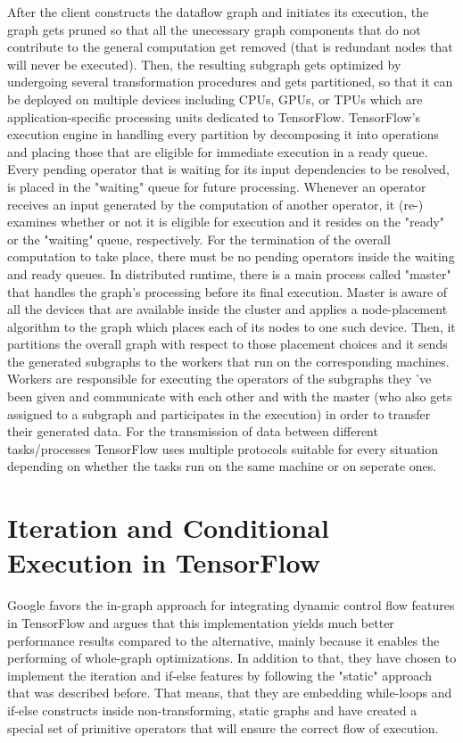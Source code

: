 \documentclass[ack,preface]{dithesis}
\begin{document}
After the client constructs the dataflow graph and initiates its execution, the graph gets pruned so that all the unecessary graph components that do not contribute to the general computation get removed (that is redundant nodes that will never be executed). Then, the resulting subgraph gets optimized by undergoing several transformation procedures and gets partitioned, so that it can be deployed on multiple devices including CPUs, GPUs, or TPUs which are application-specific processing units dedicated to TensorFlow. TensorFlow's execution engine in handling every partition by decomposing it into operations and placing those that are eligible for immediate execution in a ready queue. Every pending operator that is waiting for its input dependencies to be resolved, is placed in the "waiting" queue for future processing. Whenever an operator receives an input generated by the computation of another operator, it (re-) examines whether or not it is eligible for execution and it resides on the "ready" or the "waiting" queue, respectively. For the termination of the overall computation to take place, there must be no pending operators inside the waiting and ready queues.
In distributed runtime, there is a main process called "master" that handles the graph's processing before its final execution. Master is aware of all the devices that are available inside the cluster 
and  applies a node-placement algorithm to the graph which places each of its nodes to one such device. Then, it partitions the overall graph with respect to those placement choices and it sends the generated subgraphs to the workers that run on the corresponding machines. Workers are responsible for executing the operators of the subgraphs they 've been given and communicate with each other and with the master (who also gets assigned to a subgraph and participates in the execution) in order to transfer their generated data. For the transmission of data  between different tasks/processes TensorFlow uses multiple protocols suitable for every situation depending on whether the tasks run on the same machine or on seperate ones.

    \section{Iteration and Conditional Execution in TensorFlow}
Google favors the in-graph approach for integrating dynamic control flow features in TensorFlow and argues that this implementation yields much better performance results compared to the alternative, mainly because it enables the performing of whole-graph optimizations. \cite{Yu:2018} In addition to that, they have chosen to implement the iteration and if-else features by following the "static" approach that was described before. That means, that they are embedding while-loops and if-else constructs inside non-transforming, static graphs and have created a special set of primitive operators that will ensure the correct flow of execution.
\end{document}
